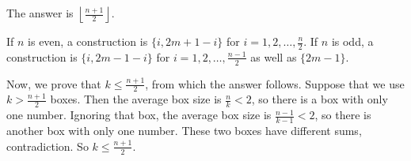 The answer is $\left\lfloor\frac{n+1}{2}\right\rfloor$.

If $n$ is even, a construction is $\{i,2m+1-i\}$ for $i=1,2,\ldots,\frac{n}{2}$. If $n$ is odd, a construction is $\{i,2m-1-i\}$ for $i=1,2,\dots,\frac{n-1}{2}$ as well as $\{2m-1\}$.

Now, we prove that $k\leq\frac{n+1}{2}$, from which the answer follows. Suppose that we use $k>\frac{n+1}{2}$ boxes. Then the average box size is $\frac{n}{k}<2$, so there is a box with only one number. Ignoring that box, the average box size is $\frac{n-1}{k-1}<2$, so there is another box with only one number. These two boxes have different sums, contradiction. So $k\leq\frac{n+1}{2}$.